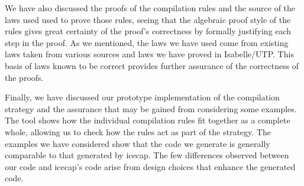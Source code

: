We have also discussed the proofs of the compilation rules and the
source of the laws used used to prove those rules, seeing that the
algebraic proof style of the rules gives great certainty of the
proof's correctness by formally justifying each step in the proof.
As we mentioned, the laws we have used come from existing \Circus{}
laws taken from various sources and laws we have proved in
Isabelle/UTP.
This basis of laws known to be correct provides further assurance of
the correctness of the proofs.

Finally, we have discussed our prototype implementation of the
compilation strategy and the assurance that may be gained from
considering some examples.
The tool shows how the individual compilation rules fit together as a
complete whole, allowing us to check how the rules act as part of the
strategy.
The examples we have considered show that the code we generate is
generally comparable to that generated by icecap.
The few differences observed between our code and icecap's code arise
from design choices that enhance the generated code.


